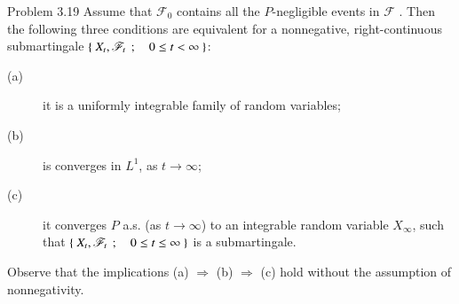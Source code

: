	\begin{itembox}[l]{Problem 3.19}
		Assume that $\mathscr{F}_0$ contains all the $P$-negligible events in $\mathscr{F}$ \footnotemark.
		Then the following three conditions are equivalent for a nonnegative, right-continuous 
		submartingale $\left\{\ X_t,\mathscr{F}_t\ \, ; \quad 0 \leq t < \infty\ \right\}$:
		\begin{description}
			\item[(a)] it is a uniformly integrable family of random variables;
			\item[(b)] is converges in $L^1$, as $t \to \infty$;
			\item[(c)] it converges $P$ a.s. (as $t \to \infty$) to an integrable random variable $X_\infty$,
			such that $\left\{\ X_t,\mathscr{F}_t\ \, ; \quad 0 \leq t \leq \infty\ \right\}$ is a submartingale.
		\end{description}
		Observe that the implications (a) $\Rightarrow$ (b) $\Rightarrow$ (c) hold without the assumption of nonnegativity. 
	\end{itembox}
